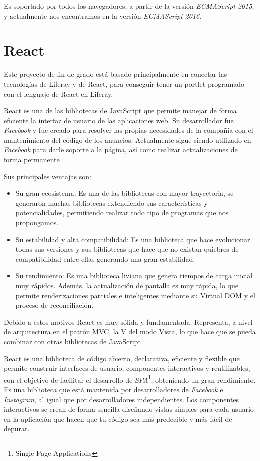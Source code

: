 \documentclass[a4paper, 12pt]{book}
\begin{document}
Es soportado por todos los navegadores, a partir de la versión \textit{ECMAScript} \textit{2015}, y actualmente nos encontramos en la versión \textit{ECMAScript} \textit{2016}.



\section{React}
\label{subsec:react}
Este proyecto de fin de grado está basado principalmente en conectar las tecnologías de Liferay y de React, para conseguir tener un portlet programado con el lenguaje de React en Liferay.

\vspace{5mm}
React es una de las bibliotecas de JavaScript que permite manejar de forma eficiente la interfaz de usuario de las aplicaciones web. Su desarrollador fue \textit{Facebook} y fue creado para resolver las propias necesidades de la compañía con el mantenimiento del código de los anuncios. Actualmente sigue siendo utilizado en \textit{Facebook} para darle soporte a la página, así como realizar actualizaciones de forma permanente~\cite{react_misc}.

\vspace{5mm}
Sus principales ventajas son:

\begin{itemize}
\item Su gran ecosistema: Es una de las bibliotecas con mayor trayectoria, se generaron muchas bibliotecas extendiendo sus características y potencialidades, permitiendo realizar todo tipo de programas que nos propongamos.
\item Su estabilidad y alta compatibilidad: Es una biblioteca que hace evolucionar todas sus versiones y sus bibliotecas que hace que no existan quiebres de compatibilidad entre ellas generando una gran estabilidad.
\item Su rendimiento: Es una biblioteca liviana que genera tiempos de carga inicial muy rápidos. Además, la actualización de pantalla es muy rápida, lo que permite renderizaciones parciales e inteligentes mediante su Virtual DOM y el proceso de reconciliación.
\end{itemize}

Debido a estos motivos React es muy sólida y fundamentada. Representa, a nivel de arquitectura en el patrón MVC, la V del modo Vista, lo que hace que se pueda combinar con otras bibliotecas de JavaScript~\cite{react_book}.

\vspace{5mm}
React es una biblioteca de código abierto, declarativa, eficiente y flexible que permite construir interfaces de usuario, componentes interactivos y reutilizables, con el objetivo de facilitar el desarrollo de \textit{SPA}\footnote{Single Page Applications}, obteniendo un gran rendimiento. Es una biblioteca que está mantenida por desarrolladores de \textit{Facebook} e \textit{Instagram}, al igual que por desarrolladores independientes. Los componentes interactivos se crean de forma sencilla diseñando vistas simples para cada usuario en la aplicación que hacen que tu código sea más predecible y más fácil de depurar. 
\end{document}
